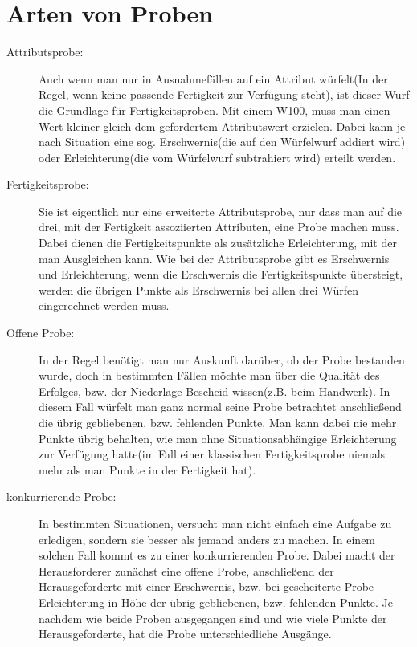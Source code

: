 \documentclass[a4paper,12pt,oneside]{book}
\begin{document}
\section{Arten von Proben}
\begin{description}
\item[Attributsprobe:]Auch wenn man nur in Ausnahmefällen auf ein Attribut würfelt(In der Regel, wenn keine passende Fertigkeit zur Verfügung steht), ist dieser Wurf die Grundlage für Fertigkeitsproben. Mit einem W100, muss man einen Wert kleiner gleich dem gefordertem Attributswert erzielen. Dabei kann je nach Situation eine sog. Erschwernis(die auf den Würfelwurf addiert wird) oder Erleichterung(die vom Würfelwurf subtrahiert wird) erteilt werden. 
\item[Fertigkeitsprobe:]
Sie ist eigentlich nur eine erweiterte Attributsprobe, nur dass man auf die drei, mit der Fertigkeit assoziierten Attributen, eine Probe machen muss. Dabei dienen die Fertigkeitspunkte als zusätzliche Erleichterung, mit der man Ausgleichen kann. Wie bei der Attributsprobe gibt es Erschwernis und Erleichterung, wenn die Erschwernis die Fertigkeitspunkte übersteigt, werden die übrigen Punkte als Erschwernis bei allen drei Würfen eingerechnet werden muss.
\item[Offene Probe:]
In der Regel benötigt man nur Auskunft darüber, ob der Probe bestanden wurde, doch in bestimmten Fällen möchte man über die Qualität des Erfolges, bzw. der Niederlage Bescheid wissen(z.B. beim Handwerk). In diesem Fall würfelt man ganz normal seine Probe betrachtet anschließend die übrig gebliebenen, bzw. fehlenden Punkte. Man kann dabei nie mehr Punkte übrig behalten, wie man ohne Situationsabhängige Erleichterung zur Verfügung hatte(im Fall einer klassischen Fertigkeitsprobe niemals mehr als man Punkte in der Fertigkeit hat).
\item[konkurrierende Probe:]
In bestimmten Situationen, versucht man nicht einfach eine Aufgabe zu erledigen, sondern sie besser als jemand anders zu machen. In einem solchen Fall kommt es zu einer konkurrierenden Probe. Dabei macht der Herausforderer zunächst eine offene Probe, anschließend der Herausgeforderte mit einer Erschwernis, bzw. bei gescheiterte Probe Erleichterung in Höhe der übrig gebliebenen, bzw. fehlenden Punkte. Je nachdem wie beide Proben ausgegangen sind und wie viele Punkte der Herausgeforderte, hat die Probe unterschiedliche Ausgänge. 
\end{description}
\end{document}
